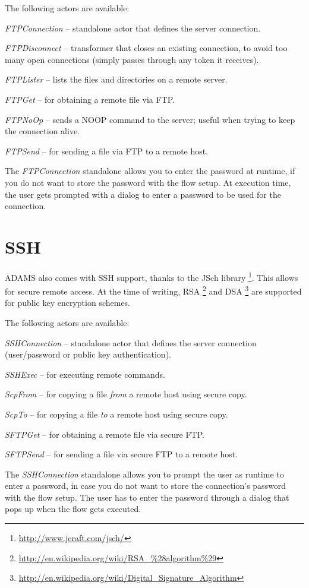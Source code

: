 \documentclass[a4paper]{book}
\begin{document}
The following actors are available:
\begin{tight_itemize}
	\item \textit{FTPConnection} -- standalone actor that defines the server
	connection.
	\item \textit{FTPDisconnect} -- transformer that closes an existing 
	connection, to avoid too many open connections (simply passes through any 
	token it receives).
	\item \textit{FTPLister} -- lists the files and directories on a remote
	server.
	\item \textit{FTPGet} -- for obtaining a remote file via FTP.
	\item \textit{FTPNoOp} -- sends a NOOP command to the server; useful when
	trying to keep the connection alive.
	\item \textit{FTPSend} -- for sending a file via FTP to a remote host.
\end{tight_itemize}
The \textit{FTPConnection} standalone allows you to enter the password at 
runtime, if you do not want to store the password with the
flow setup. At execution time, the user gets prompted with a dialog to enter
a password to be used for the connection.


\chapter{SSH}
ADAMS also comes with SSH support, thanks to the JSch library
\footnote{\url{http://www.jcraft.com/jsch/}{}}. This allows for secure remote
access. At the time of writing, RSA
\footnote{\url{http://en.wikipedia.org/wiki/RSA_\%28algorithm\%29}{}} and DSA
\footnote{\url{http://en.wikipedia.org/wiki/Digital_Signature_Algorithm}{}} are
supported for public key encryption schemes.

The following actors are available:
\begin{tight_itemize}
	\item \textit{SSHConnection} -- standalone actor that defines the server
	connection (user/password or public key authentication).
	\item \textit{SSHExec} -- for executing remote commands.
	\item \textit{ScpFrom} -- for copying a file \textit{from} a remote host using
	secure copy.
	\item \textit{ScpTo} -- for copying a file \textit{to} a remote host using
	secure copy.
	\item \textit{SFTPGet} -- for obtaining a remote file via secure FTP.
	\item \textit{SFTPSend} -- for sending a file via secure FTP to a remote host.
\end{tight_itemize}
The \textit{SSHConnection} standalone allows you to prompt the user as runtime
to enter a password, in case you do not want to store the connection's password
with the flow setup. The user has to enter the password through a dialog that
pops up when the flow gets executed.
\end{document}
